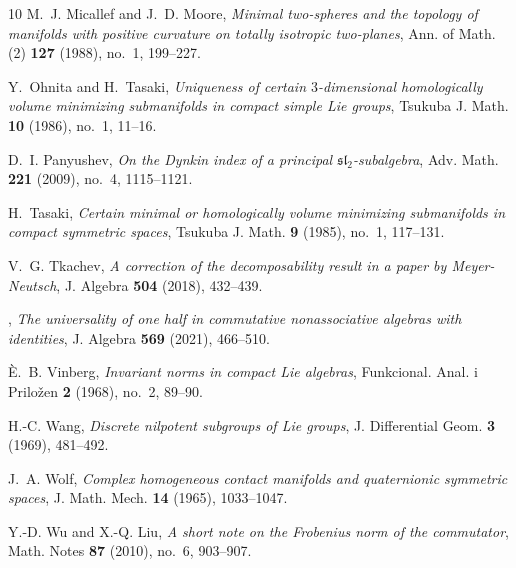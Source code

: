 \documentclass[leqno,10pt]{amsart}
\theoremstyle{definition}
\numberwithin{equation}{section}
\begin{document}
\begin{thebibliography}{10}
M.~J. Micallef and J.~D. Moore, \emph{Minimal two-spheres and the topology of
  manifolds with positive curvature on totally isotropic two-planes}, Ann. of
  Math. (2) \textbf{127} (1988), no.~1, 199--227.

Y.~Ohnita and H.~Tasaki, \emph{Uniqueness of certain {$3$}-dimensional
  homologically volume minimizing submanifolds in compact simple {L}ie groups},
  Tsukuba J. Math. \textbf{10} (1986), no.~1, 11--16.

D.~I. Panyushev, \emph{On the {D}ynkin index of a principal
  {$\mathfrak{sl}_2$}-subalgebra}, Adv. Math. \textbf{221} (2009), no.~4,
  1115--1121.

H.~Tasaki, \emph{Certain minimal or homologically volume minimizing
  submanifolds in compact symmetric spaces}, Tsukuba J. Math. \textbf{9}
  (1985), no.~1, 117--131.

V.~G. Tkachev, \emph{A correction of the decomposability result in a paper by
  {M}eyer-{N}eutsch}, J. Algebra \textbf{504} (2018), 432--439.

\bysame, \emph{The universality of one half in commutative nonassociative
  algebras with identities}, J. Algebra \textbf{569} (2021), 466--510.

{\`E}.~B. Vinberg, \emph{Invariant norms in compact {L}ie algebras},
  Funkcional. Anal. i Prilo\v zen \textbf{2} (1968), no.~2, 89--90.

H.-C. Wang, \emph{Discrete nilpotent subgroups of {L}ie groups}, J.
  Differential Geom. \textbf{3} (1969), 481--492.

J.~A. Wolf, \emph{Complex homogeneous contact manifolds and quaternionic
  symmetric spaces}, J. Math. Mech. \textbf{14} (1965), 1033--1047.

Y.-D. Wu and X.-Q. Liu, \emph{A short note on the {F}robenius norm of the
  commutator}, Math. Notes \textbf{87} (2010), no.~6, 903--907.

\end{thebibliography}
\end{document}
